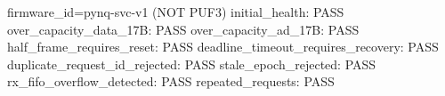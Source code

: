 \begin{codeblock}
firmware_id=pynq-svc-v1 (NOT PUF3)
initial_health: PASS
over_capacity_data_17B: PASS
over_capacity_ad_17B: PASS
half_frame_requires_reset: PASS
deadline_timeout_requires_recovery: PASS
duplicate_request_id_rejected: PASS
stale_epoch_rejected: PASS
rx_fifo_overflow_detected: PASS
repeated_requests: PASS
\end{codeblock}
